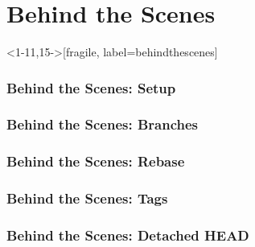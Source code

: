 \documentclass{beamer}
\begin{document}

\section{Behind the Scenes}


\begin{frame}<1-11,15->[fragile, label=behindthescenes]
  \frametitle<1-4,15>{Behind the Scenes: Setup}
  \frametitle<5-11>{Behind the Scenes: Branches}
  \frametitle<12-14>{Behind the Scenes: Rebase}
  \def\develmax{13}
  \def\mastermax{14}
  \frametitle<16-17>{Behind the Scenes: Tags}
  \frametitle<18->{Behind the Scenes: Detached HEAD}


\def\xshift{2cm}
\def\yshift{1cm}
\def\ccol{black}
\def\bcol{green}
\def\hcol{brown}
\def\tcol{orange}

\newcommand{\head}[1]{
\only<\sid>{
\node (head) [head, xshift=\xshift] at (#1) { HEAD };
\draw [harrow] (head) edge (#1);
}
}
\newcommand{\heady}[1]{
\only<\sid>{
\node (head) [head, yshift=\yshift] at (#1) { HEAD };
\draw [harrow] (head) edge (#1);
}
}
\newcommand{\master}[1]{
\only<\sid>{
\node (master) [branch, yshift=-\yshift] at (#1) { master };
\draw [barrow] (master) edge (#1);
}
}
\newcommand{\devel}[1]{
\only<\sid>{
\node (devel) [branch, yshift=\yshift] at (#1) { devel };
\draw [barrow] (devel) edge (#1);
}
}
\newcommand{\masterhead}[1]{
\master{#1}
\head{master}
}
\newcommand{\develhead}[1]{
\devel{#1}
\head{devel}
}
\newcommand{\gitcmd}[1]{
\only<\sid>{
\node (gitcmd) [xshift=2.3*\xshift, yshift=3*\yshift, align=center] at (a) { \texttt{#1} };
}
}

\newcount\sid
{} 
\newcommand{\next}{\advance\sid by 1 }
\end{frame}
\end{document}

